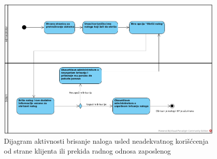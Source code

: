 \begin{figure}[H]
\begin{center}
\includegraphics[width=\textwidth]{Pictures/activity_employee_delete.png}
\end{center}
    \caption{Dijagram aktivnosti brisanje naloga usled neadekvatnog korišćcenja od strane klijenta ili prekida radnog odnosa zaposlenog}
\label{fig:ActivityDeleteEmployeeAccount}
\end{figure}
